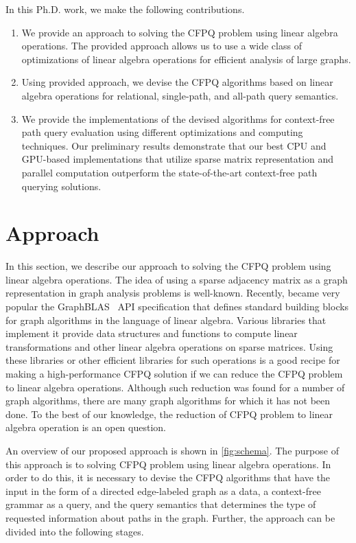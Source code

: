 \documentclass[sigconf, nonacm]{acmart}
\begin{document}
In this Ph.D. work, we make the following contributions.
\begin{enumerate}
	\item We provide an approach to solving the CFPQ problem using linear algebra operations. The provided approach allows us to use a wide class of optimizations of linear algebra operations for efficient analysis of large graphs.
	
	\item Using provided approach, we devise the CFPQ algorithms based on linear algebra operations for relational, single-path, and all-path query semantics.
	
	\item We provide the implementations of the devised algorithms for context-free path query evaluation using different optimizations	and computing techniques. Our preliminary results demonstrate that our best CPU and GPU-based implementations that utilize sparse matrix representation and parallel computation outperform the state-of-the-art context-free path querying solutions.
\end{enumerate}

\section{Approach}

In this section, we describe our approach to solving the CFPQ problem using linear algebra operations. The idea of using a sparse adjacency matrix as a graph representation in graph analysis problems is well-known. Recently, became very popular the GraphBLAS~\cite{7761646} API specification that defines standard building blocks for graph algorithms in the language of linear algebra. Various libraries that implement it provide data structures and functions to compute linear transformations and other linear algebra operations on sparse matrices. Using these libraries or other efficient libraries for such operations is a good recipe for making a high-performance CFPQ solution if we can reduce the CFPQ problem to linear algebra operations. Although such reduction was found for a number of graph algorithms, there are many graph algorithms for which it has not been done. To the best of our knowledge, the reduction of CFPQ problem to linear algebra operation is an open question.

An overview of our proposed approach is shown in \autoref{fig:schema}. The purpose of this approach is to solving CFPQ problem using linear algebra operations. In order to do this, it is necessary to devise the CFPQ algorithms that have the input in the form of a directed edge-labeled graph as a data, a context-free grammar as a query, and the query semantics that determines the type of requested information about paths in the graph. Further, the approach can be divided into the following stages.
\end{document}
